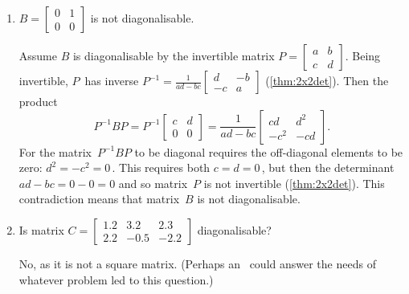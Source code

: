 \begin{example}
\begin{enumerate}
\item \label{eg:diagonaliseb}\(B=\begin{bmatrix} 0&1\\0&0 \end{bmatrix}\) is not diagonalisable.
\begin{solution} 
Assume \(B\) is diagonalisable by the invertible matrix \(P=\begin{bmatrix} a&b\\c&d \end{bmatrix}\).
Being invertible, \(P\)~has inverse \(P^{-1}=\frac1{ad-bc}\begin{bmatrix} d&-b\\-c&a \end{bmatrix}\)  (\autoref{thm:2x2det}).
Then the product
\begin{equation*}
P^{-1}BP=P^{-1}\begin{bmatrix} c&d\\0&0 \end{bmatrix}
=\frac1{ad-bc}\begin{bmatrix} cd&d^2\\-c^2&-cd \end{bmatrix}.
\end{equation*}
For the matrix~\(P^{-1}BP\) to be diagonal requires the off-diagonal elements to be zero: \(d^2=-c^2=0\)\,.
This requires both \(c=d=0\)\,, but then the determinant \(ad-bc=0-0=0\) and so matrix~\(P\) is not invertible (\autoref{thm:2x2det}).
This contradiction means that matrix~\(B\) is not diagonalisable.
\end{solution}

\item Is matrix \(C=\begin{bmatrix}1.2& 3.2& 2.3
\\   2.2&-0.5&-2.2\end{bmatrix}\) diagonalisable?
\begin{solution} 
No, as it is not a square matrix.
(Perhaps an \svd\ could answer the needs of whatever problem led to this question.) 
\end{solution}

\end{enumerate}
\end{example}


